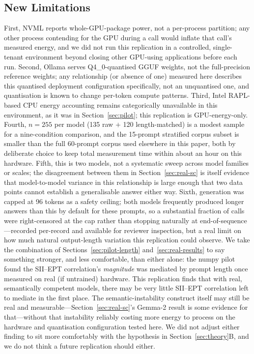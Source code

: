 \documentclass[conference]{IEEEtran}
\begin{document}
\subsection{New Limitations}
\label{sec:real-limits}
First, NVML reports whole-GPU-package power, not a per-process
partition; any other process contending for the GPU during a call
would inflate that call's measured energy, and we did not run this
replication in a controlled, single-tenant environment beyond closing
other GPU-using applications before each run. Second, Ollama serves
Q4\_0-quantised GGUF weights, not the full-precision reference
weights; any relationship (or absence of one) measured here describes
this quantised deployment configuration specifically, not an
unquantised one, and quantisation is known to change per-token
compute patterns. Third, Intel RAPL-based CPU energy accounting
remains categorically unavailable in this environment, as it was in
Section~\ref{sec:pilot}; this replication is GPU-energy-only. Fourth,
$n=255$ per model (135 raw $+$ 120 length-matched) is a modest sample
for a nine-condition comparison, and the 15-prompt stratified corpus
subset is smaller than the full 60-prompt corpus used elsewhere in
this paper, both by deliberate choice to keep total measurement time
within about an hour on this hardware. Fifth, this is two models,
not a systematic sweep across model families or scales; the
disagreement between them in Section~\ref{sec:real-sc} is itself
evidence that model-to-model variance in this relationship is large
enough that two data points cannot establish a generalisable
answer either way. Sixth, generation was capped at 96 tokens as a
safety ceiling; both models frequently produced longer answers than
this by default for these prompts, so a substantial fraction of
calls were right-censored at the cap rather than stopping naturally
at end-of-sequence---recorded per-record and available for reviewer
inspection, but a real limit on how much natural output-length
variation this replication could observe.
We take the combination of Sections~\ref{sec:pilot-length}
and~\ref{sec:real-results} to say something stronger, and less
comfortable, than either alone: the numpy pilot found the SII--EPT
correlation's \emph{magnitude} was mediated by prompt length once
measured on real (if untrained) hardware. This replication finds that
with real, semantically competent models, there may be very little
SII--EPT correlation left to mediate in the first place. The
semantic-instability construct itself may still be real and
measurable---Section~\ref{sec:real-sc}'s Gemma-2 result is some
evidence for that---without that instability reliably costing more
energy to process on the hardware and quantisation configuration
tested here. We did not adjust either finding to sit more comfortably
with the hypothesis in Section~\ref{sec:theory}B, and we do not think
a future replication should either.
\end{document}
